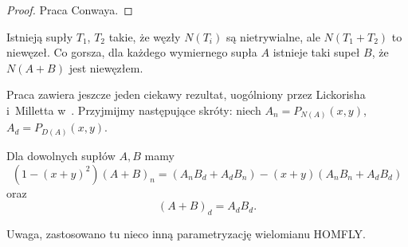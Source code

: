 \begin{proof}
    Praca \cite{conway70} Conwaya.
\end{proof}

Istnieją supły $T_1$, $T_2$ takie, że węzły $N(T_i)$ są nietrywialne, ale $N(T_1 + T_2)$ to niewęzeł.
Co gorsza, dla każdego wymiernego supła $A$ istnieje taki supeł $B$, że $N(A+B)$ jest niewęzłem.

Praca \cite{conway70} zawiera jeszcze jeden ciekawy rezultat, uogólniony przez Lickorisha i~Milletta w~\cite{lickorish87}.
Przyjmijmy następujące skróty: niech $A_n = P_{N(A)}(x,y)$, $A_d = P_{D(A)}(x,y)$.

\begin{proposition}
    Dla dowolnych supłów $A, B$ mamy
    \[
    (1 - (x+y)^2)(A+B)_n = (A_nB_d + A_dB_n) - (x+y)(A_nB_n+  A_dB_d)
    \]
    oraz
    \[
        (A+B)_d = A_dB_d.
    \]
\end{proposition}

Uwaga, zastosowano tu nieco inną parametryzację wielomianu HOMFLY.





